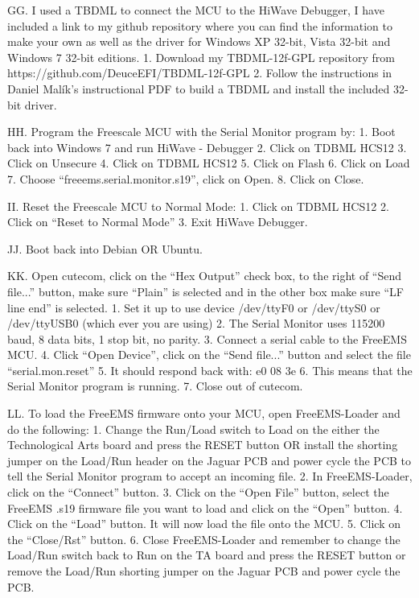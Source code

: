 \documentclass[12pt,notitlepage,onecolumn,oneside,openany,draft]{memoir}
\begin{document}
GG. I used a TBDML to connect the MCU to the HiWave Debugger, I have included a link to my github repository where you can find the information to make your own as well as the driver for Windows XP 32-bit, Vista 32-bit and Windows 7 32-bit editions.
1. Download my TBDML-12f-GPL repository from https://github.com/DeuceEFI/TBDML-12f-GPL
2. Follow the instructions in Daniel Malík's instructional PDF to build a TBDML and install the included 32-bit driver.

HH. Program the Freescale MCU with the Serial Monitor program by:
1. Boot back into Windows 7 and run HiWave - Debugger
2. Click on TDBML HCS12
3. Click on Unsecure
4. Click on TDBML HCS12
5. Click on Flash
6. Click on Load
7. Choose “freeems.serial.monitor.s19”, click on Open. 
8. Click on Close.

II. Reset the Freescale MCU to Normal Mode:
1. Click on TDBML HCS12
2. Click on “Reset to Normal Mode”
3. Exit HiWave Debugger.

JJ. Boot back into Debian OR Ubuntu.

KK. Open cutecom, click on the “Hex Output” check box, to the right of “Send file...” button, make sure “Plain” is selected and in the other box make sure “LF line end” is selected.
1. Set it up to use device /dev/ttyF0 or /dev/ttyS0 or /dev/ttyUSB0 (which ever you are using)
2. The Serial Monitor uses 115200 baud, 8 data bits, 1 stop bit, no parity.
3. Connect a serial cable to the FreeEMS MCU.
4. Click “Open Device”, click on the “Send file...” button and select the file “serial.mon.reset”
5. It should respond back with: e0 08 3e
6. This means that the Serial Monitor program is running.  
7. Close out of cutecom.

LL. To load the FreeEMS firmware onto your MCU, open FreeEMS-Loader and do the following:
1. Change the Run/Load switch to Load on the either the Technological Arts board and press the RESET button OR install the shorting jumper on the Load/Run header on the Jaguar PCB and power cycle the PCB to tell the Serial Monitor program to accept an incoming file. 
2. In FreeEMS-Loader, click on the “Connect” button.
3. Click on the “Open File” button, select the FreeEMS .s19 firmware file you want to load and click on the “Open” button.
4. Click on the “Load” button.  It will now load the file onto the MCU.
5. Click on the “Close/Rst” button.
6. Close FreeEMS-Loader and remember to change the Load/Run switch back to Run on the TA board and press the RESET button or remove the Load/Run shorting jumper on the Jaguar PCB and power cycle the PCB.
\end{document}
